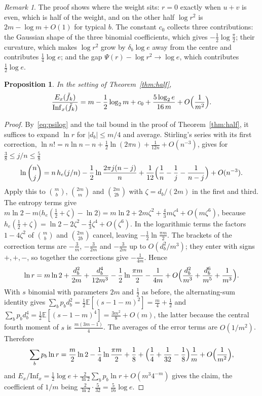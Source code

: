 \documentclass[11pt]{amsart}
\newtheorem{proposition}[theorem]{Proposition}
\theoremstyle{remark}
\newtheorem{remark}[theorem]{Remark}
\newcommand{\Inf}{\mathrm{Inf}}
\newcommand{\E}{\mathbb{E}}
\begin{document}
\begin{remark}
The proof shows where the weight sits: $r=0$ exactly when $u+v$ is even, which is half of the weight, and on the other
half $\log r^2$ is $2m-\log m+O(1)$ for typical $b$. The constant $c_0$ collects three contributions: the
Gaussian shape of the three binomial coefficients, which gives $-\frac12\log\frac\pi2$; their curvature, which makes
$\log r^2$ grow by $\delta_b\log e$ away from the centre and contributes $\frac14\log e$; and the gap
$\Psi(r)-\log r^2\to\log e$, which contributes $\frac12\log e$.
\end{remark}

\begin{proposition}\label{prop:next}
In the setting of Theorem~\ref{thm:half},
\[
\frac{E_x(\tilde f_k)}{\Inf_x(\tilde f_k)}=m-\frac12\log_2m+c_0+\frac{5\log_2e}{16\,m}+O\Bigl(\frac1{m^2}\Bigr).
\]
\end{proposition}

\begin{proof}
By~\eqref{eq:psilog} and the tail bound in the proof of Theorem~\ref{thm:half}, it suffices to expand
$\ln r$ for $|d_b|\le m/4$ and average. Stirling's series with its first correction,
$\ln n!=n\ln n-n+\frac12\ln(2\pi n)+\frac1{12n}+O(n^{-3})$, gives for $\frac38\le j/n\le\frac58$
\[
\ln\binom nj=n\,h_e(j/n)-\frac12\ln\frac{2\pi j(n-j)}n+\frac1{12}\Bigl(\frac1n-\frac1j-\frac1{n-j}\Bigr)+O(n^{-3}).
\]
Apply this to $\binom mb$, $\binom{2m}m$ and $\binom{2m}{2b}$ with $\zeta=d_b/(2m)$ in the first and third. The
entropy terms give $m\ln2-m\bigl(h_e(\frac12+\zeta)-\ln2\bigr)=m\ln2+2m\zeta^2+\frac43m\zeta^4+O(m\zeta^6)$, because
$h_e(\frac12+\zeta)=\ln2-2\zeta^2-\frac43\zeta^4+O(\zeta^6)$. In the logarithmic terms the factors $1-4\zeta^2$ of
$\binom mb$ and $\binom{2m}{2b}$ cancel, leaving $-\frac12\ln\frac{\pi m}2$. The brackets of the correction terms
are $-\frac3m$, $-\frac3{2m}$ and $-\frac3{2m}$ up to $O(d_b^2/m^3)$; they enter with signs $+,+,-$, so together the
corrections give $-\frac1{4m}$. Hence
\[
\ln r=m\ln2+\frac{d_b^2}{2m}+\frac{d_b^4}{12m^3}-\frac12\ln\frac{\pi m}2-\frac1{4m}
+O\Bigl(\frac{d_b^2}{m^3}+\frac{d_b^6}{m^5}+\frac1{m^3}\Bigr).
\]
With $s$ binomial with parameters $2m$ and $\frac12$ as before, the alternating-sum identity gives
$\sum_bp_bd_b^2=\frac12\E[(s-1-m)^2]=\frac m4+\frac12$ and $\sum_bp_bd_b^4=\frac12\E[(s-1-m)^4]=\frac{3m^2}8+O(m)$, the
latter because the central fourth moment of $s$ is $\frac{m(3m-1)}4$. The averages of the error terms are
$O(1/m^2)$. Therefore
\[
\sum_bp_b\ln r=\frac m2\ln2-\frac14\ln\frac{\pi m}2+\frac18+\Bigl(\frac14+\frac1{32}-\frac18\Bigr)\frac1m
+O\Bigl(\frac1{m^2}\Bigr),
\]
and $E_x/\Inf_x=\frac12\log e+\frac2{\ln2}\sum_bp_b\ln r+O(m^3 4^{-m})$ gives the claim, the coefficient of $1/m$
being $\frac2{\ln 2}\cdot\frac5{32}=\frac5{16}\log e$.
\end{proof}
\end{document}
